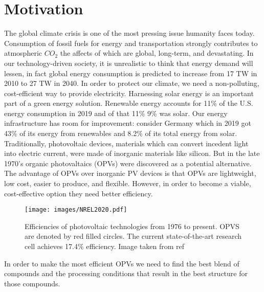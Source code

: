 \section*{Motivation}

The global climate crisis is one of the most pressing issue humanity faces today.
Consumption of fossil fuels for energy and transportation strongly contributes to atmospheric $CO_2$ the affects of which are global, long-term, and devastating\cite{Solomon2009a}.
In our technology-driven society, it is unrealistic to think that energy demand will lessen, in fact global energy consumption is predicted to increase from 17 TW in 2010 to 27 TW in 2040\cite{Mazzio2015}.
In order to protect our climate, we need a non-polluting, cost-efficient way to provide electricity.
Harnessing solar energy is an important part of a green energy solution.
Renewable energy accounts for 11\% of the U.S. energy consumption in 2019 and of that 11\% 9\% was solar\cite{USEIA2020}.
Our energy infrastructure has room for improvement: consider Germany which in 2019 got 43\% of its energy from renewables and 8.2\% of its total energy from solar\cite{Wirth2017}.
Traditionally, photovoltaic devices, materials which can convert incedent light into electric current, were made of inorganic materials like silicon.
But in the late 1970's organic photovaltaics (OPVs) were discovered as a potential alternative\cite{Tang1986b}.
The advantage of OPVs over inorganic PV devices is that OPVs are lightweight, low cost, easier to produce, and flexible. 
However, in order to become a viable, cost-effective option they need better efficiency\cite{Mazzio2015}.

\begin{figure}[h!]
    \texttt{[image: images/NREL2020.pdf]}
    \caption{Efficiencies of photovoltaic technologies from 1976 to present. OPVS are denoted by red filled circles. The current state-of-the-art research cell achieves 17.4\% efficiency. Image taken from ref \cite{NREL2020}}
    \label{fig:nrel}
\end{figure}

In order to make the most efficient OPVs we need to find the best blend of compounds and the processing conditions that result in the best structure for those compounds.

